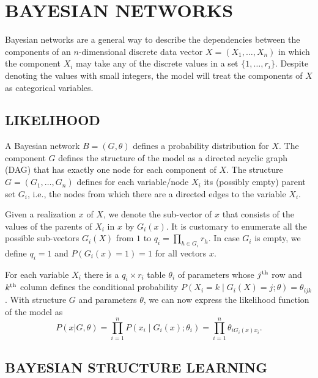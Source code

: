 \section{BAYESIAN NETWORKS}
\label{sec:bns}

Bayesian networks are a general way to describe the dependencies
between the components of an $n$\nobreakdash-dimensional discrete data
vector $X=(X_{1},\ldots,X_{n})$ in which the component $X_{i}$ may
take any of the discrete values in a set $\{1,\ldots,r_{i}\}$.
Despite denoting the values with small integers, the model will treat
the components of $X$ as categorical variables.


\subsection{LIKELIHOOD}
\label{ssec:likelihood}

A Bayesian network $B=(G,\theta)$ defines a probability distribution for
$X$. The component $G$ defines the structure of the model as a
directed acyclic graph (DAG) that has exactly one node for each component of
$X$. The structure $G=(G_{1},\ldots,G_{n})$ defines for each
variable/node $X_{i}$ its (possibly empty) parent set $G_{i}$, i.e.,
the nodes from which there are a directed edges to the variable
$X_{i}$.

Given a realization $x$ of $X$, we denote the sub\nobreakdash-vector
of $x$ that consists of the values of the parents of $X_{i}$ in $x$ by
$G_{i}(x)$. It is customary to enumerate all the possible
sub\nobreakdash-vectors $G_{i}(X)$ from $1$ to $q_{i}=\prod_{h\in
  G_{i}}r_{h}.$ In case $G_{i}$ is empty, we define $q_{i}=1$ and
$P(G_{i}(x)=1)=1$ for all vectors $x$.

For each variable $X_{i}$ there is a $q_{i}\times r_{i}$ table
$\theta_{i}$ of parameters whose $j^{\textnormal{th}}$ row and
$k^{\textnormal{th}}$ column defines the conditional probability
$P(X_{i}=k\mid G_{i}(X)=j;\theta)=\theta_{ijk}$.  With structure $G$
and parameters $\theta$, we can now express the likelihood function of
the model as
\begin{equation}
P(x|G,\theta)=\prod_{i=1}^{n}P(x_{i}\mid
G_{i}(x);\theta_{i})=\prod_{i=1}^{n}\theta_{iG_{i}(x)x_{i}}.
\end{equation}



\subsection{BAYESIAN STRUCTURE LEARNING}

